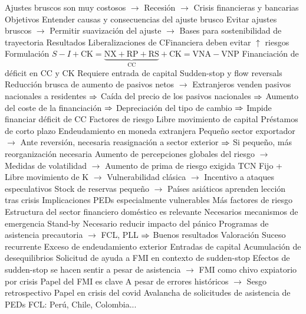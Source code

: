 \documentclass{nuevotema}
\begin{document}
\begin{esquemal}
				\4[] Ajustes bruscos son muy costosos
				\4[] $\to$ Recesión
				\4[] $\to$ Crisis financieras y bancarias
				\4 Objetivos
				\4[] Entender causas y consecuencias del ajuste brusco
				\4[] Evitar ajustes bruscos
				\4[] $\to$ Permitir suavización del ajuste
				\4[] $\to$ Bases para sostenibilidad de trayectoria
				\4 Resultados
				\4[] Liberalizaciones de CFinanciera deben evitar $\uparrow$ riesgos
				\4[]
			\3 Formulación
				\4 $S-I+\text{CK} = \underbrace{\text{NX}+\text{RP} + \text{RS}}_{\text{CC}} +\text{CK} = \text{VNA} - \text{VNP}$
				\4 Financiación de déficit en CC y CK
				\4[] Requiere entrada de capital
				\4 Sudden-stop y flow reversals
				\4[] Reducción brusca de aumento de pasivos netos
				\4[] $\to$ Extranjeros venden pasivos nacionales a residentes
				\4[] $\Rightarrow$ Caída del precio de los pasivos nacionales
				\4[] $\Rightarrow$ Aumento del coste de la financiación
				\4[] $\Rightarrow$ Depreciación del tipo de cambio
				\4[] $\Rightarrow$ Impide financiar déficit de CC
				\4 Factores de riesgo
				\4[] Libre movimiento de capital
				\4[] Préstamos de corto plazo
				\4[] Endeudamiento en moneda extranjera
				\4[] Pequeño sector exportador
				\4[] $\to$ Ante reversión, necesaria reasignación a sector exterior
				\4[] $\Rightarrow$ Si pequeño, más reorganización necesaria
				\4[] Aumento de percepciones globales del riesgo
				\4[] $\to$ Medidas de volatilidad
				\4[] $\to$ Aumento de prima de riesgo exigida
				\4[] TCN Fijo + Libre movimiento de K
				\4[] $\to$ Vulnerabilidad clásica
				\4[] $\to$ Incentivo a ataques especulativos
				\4[] Stock de reservas pequeño
				\4[] $\to$ Países asiáticos aprenden lección tras crisis
			\3 Implicaciones
				\4 PEDs especialmente vulnerables
				\4[] Más factores de riesgo
				\4 Estructura del sector financiero doméstico es relevante
				\4 Necesarios mecanismos de emergencia
				\4[] Stand-by
				\4 Necesario reducir impacto del pánico
				\4[] Programas de asistencia precautoria
				\4[] $\to$ FCL, PLL
				\4[] $\Rightarrow$ Buenos resultados
			\3 Valoración
				\4 Suceso recurrente
				\4[] Exceso de endeudamiento exterior
				\4[] Entradas de capital
				\4[] Acumulación de desequilibrios
				\4[] Solicitud de ayuda a FMI en contexto de sudden-stop
				\4[] Efectos de sudden-stop se hacen sentir a pesar de asistencia
				\4[] $\to$ FMI como chivo expiatorio por crisis
				\4 Papel del FMI es clave
				\4[] A pesar de errores históricos
				\4[] $\to$ Sesgo retrospectivo
				\4 Papel en crisis del covid
				\4[] Avalancha de solicitudes de asistencia de PEDs
				\4[] FCL: Perú, Chile, Colombia...

\end{esquemal}
\end{document}
